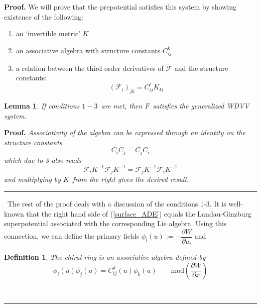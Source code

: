 \documentclass[a4paper,11pt]{article}
\newtheorem{definition}[theorem]{Definition}
\newtheorem{lemma}[theorem]{Lemma}
\newenvironment{proof}[1][Proof]{\textbf{#1.} }{\ \rule{0.5em}{0.5em}}
\numberwithin{equation}{section}
\begin{document}
\begin{proof}
We will prove that the prepotential satisfies this system by showing
existence of the following:

\begin{enumerate}
\item  an `invertible metric' $K$

\item  an associative algebra with structure constants $C_{ij}^{k}$

\item  a relation between the third order derivatives of $\mathcal{F}$ and
the structure constants: 
\begin{equation}
(\mathcal{F}_{i})_{jk}=C_{ij}^{l}K_{kl}  \label{relation}
\end{equation}
\end{enumerate}

\begin{lemma}
\textit{If conditions }$1-3$\textit{\ are met, then }$F$\textit{\ satisfies
the generalized WDVV system.}
\end{lemma}

\begin{proof}
\textit{Associativity of the algebra can be expressed through an identity on
the structure constants} 
\begin{equation}
C_{i}C_{j}=C_{j}C_{i}
\end{equation}
\textit{which due to 3 also reads } 
\begin{equation}
\mathcal{F}_{i}K^{-1}\mathcal{F}_{j}K^{-1}=\mathcal{F}_{j}K^{-1}\mathcal{F}%
_{i}K^{-1}
\end{equation}
\textit{and multiplying by }$K$\textit{\ from the right gives the
desired result.}
\end{proof}

\ \linebreak \noindent The rest of the proof deals with a discussion of the
conditions 1-3. It is well-known \cite{KLEM-LERC-YANK-THEI:1995} that the
right hand side of (\ref{surface_ADE}) equals the Landau-Ginzburg
superpotential associated with the corresponding Lie algebra. Using this
connection, we can define the primary fields $\phi _{i}(u):=-\dfrac{\partial
W}{\partial u_{i}}$ and

\begin{definition}
The chiral ring is an associative algebra defined by 
\begin{equation}
\phi _{i}(u)\phi _{j}(u)=C_{ij}^{k}(u)\phi _{k}(u)\qquad \mbox{mod}\left( 
\dfrac{\partial W}{\partial x}\right) 
\end{equation}
\end{definition}


\end{proof}
\end{document}
